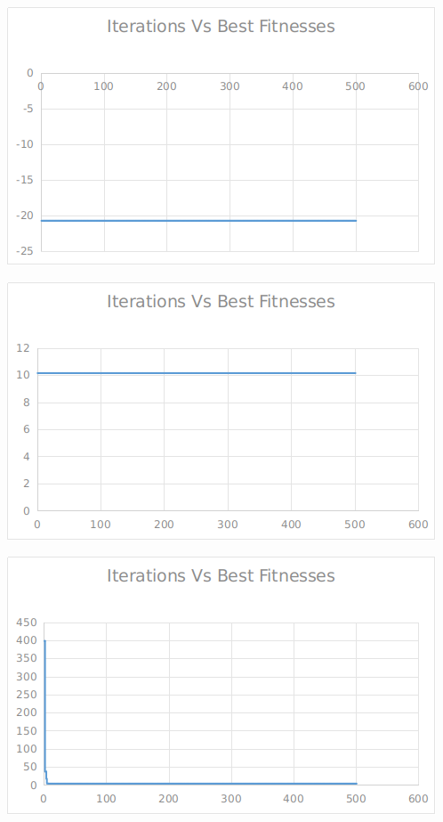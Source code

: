 \documentclass[12pt]{article}
\begin{document}
					\hfill
					\begin{minipage}{0.6\linewidth}
						\includegraphics[width=\linewidth]{24.png}
					\end{minipage}
					\begin{minipage}{0.6\linewidth}
						\includegraphics[width=\linewidth]{25.png}
					\end{minipage}
					\hfill
					\begin{minipage}{0.6\linewidth}
						\includegraphics[width=\linewidth]{26.png}
					\end{minipage}
\end{document}

